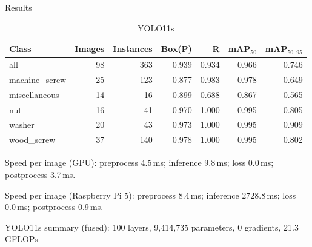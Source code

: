 \documentclass[aspectratio=169]{beamer}
\begin{document}
    \begin{frame}{Results}
        \begin{table}[!t]
            \centering
            \caption{Validation summaries.}
            \begin{subtable}{\linewidth}
              \centering
              \caption{YOLO11s}
              \begin{tabular}{lrrrrrr}
              \hline
              Class & Images & Instances & Box(P) & R & mAP$_{50}$ & mAP$_{50\mbox{--}95}$ \\
              \hline
              all            & 98 & 363 & 0.939 & 0.934 & 0.966 & 0.746 \\
              machine\_screw & 25 & 123 & 0.877 & 0.983 & 0.978 & 0.649 \\
              miscellaneous  & 14 &  16 & 0.899 & 0.688 & 0.867 & 0.565 \\
              nut            & 16 &  41 & 0.970 & 1.000 & 0.995 & 0.805 \\
              washer         & 20 &  43 & 0.973 & 1.000 & 0.995 & 0.909 \\
              wood\_screw    & 37 & 140 & 0.978 & 1.000 & 0.995 & 0.802 \\
              \hline
              \end{tabular}
              \par\smallskip
              \small Speed per image (GPU): preprocess 4.5\,ms; inference 9.8\,ms; loss 0.0\,ms; postprocess 3.7\,ms.
              \par\smallskip
              \small Speed per image (Raspberry Pi 5): preprocess 8.4\,ms; inference 2728.8\,ms; loss 0.0\,ms; postprocess 0.9\,ms.
              \par\smallskip
              \small YOLO11s summary (fused): 100 layers, 9,414,735 parameters, 0 gradients, 21.3 GFLOPs
            \end{subtable}
        \end{table}
    \end{frame}
\end{document}
